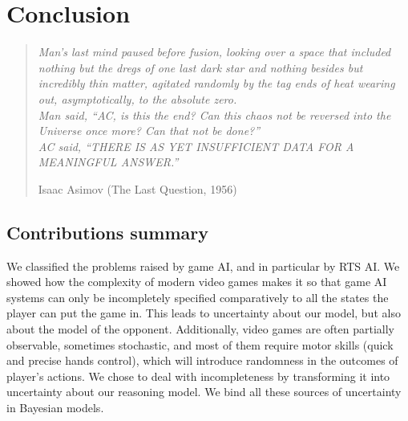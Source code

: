 \chapter{Conclusion}
\begin{quotation}\textit{
Man's last mind paused before fusion, looking over a space that included nothing but the dregs of one last dark star and nothing besides but incredibly thin matter, agitated randomly by the tag ends of heat wearing out, asymptotically, to the absolute zero.\\
Man said, ``AC, is this the end? Can this chaos not be reversed into the Universe once more? Can that not be done?''\\
AC said, ``THERE IS AS YET INSUFFICIENT DATA FOR A MEANINGFUL ANSWER.''
}
\begin{flushright}Isaac Asimov (The Last Question, 1956)\end{flushright}\end{quotation}


\section{Contributions summary}
We classified the problems raised by game AI, and in particular by RTS AI. We showed how the complexity of modern video games makes it so that game AI systems can only be incompletely specified comparatively to all the states the player can put the game in. This leads to uncertainty about our model, but also about the model of the opponent. Additionally, video games are often partially observable, sometimes stochastic, and most of them require motor skills (quick and precise hands control), which will introduce randomness in the outcomes of player's actions. We chose to deal with incompleteness by transforming it into uncertainty about our reasoning model. We bind all these sources of uncertainty in Bayesian models. 

